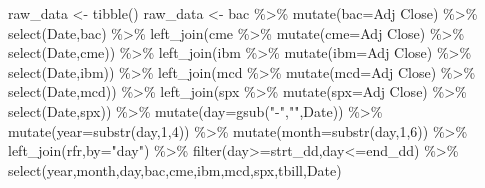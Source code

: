 \documentclass[
  a4paper,
  DIV=11,
  numbers=noendperiod]{scrreprt}
\newenvironment{Shaded}{\begin{snugshade}}{\end{snugshade}}
\newcommand{\AttributeTok}[1]{\textcolor[rgb]{0.40,0.45,0.13}{#1}}
\newcommand{\DecValTok}[1]{\textcolor[rgb]{0.68,0.00,0.00}{#1}}
\newcommand{\FunctionTok}[1]{\textcolor[rgb]{0.28,0.35,0.67}{#1}}
\newcommand{\NormalTok}[1]{\textcolor[rgb]{0.00,0.23,0.31}{#1}}
\newcommand{\OtherTok}[1]{\textcolor[rgb]{0.00,0.23,0.31}{#1}}
\newcommand{\SpecialCharTok}[1]{\textcolor[rgb]{0.37,0.37,0.37}{#1}}
\newcommand{\StringTok}[1]{\textcolor[rgb]{0.13,0.47,0.30}{#1}}
\begin{document}
\begin{Shaded}
\begin{Highlighting}[]
\NormalTok{raw\_data }\OtherTok{\textless{}{-}} \FunctionTok{tibble}\NormalTok{()}
\NormalTok{raw\_data }\OtherTok{\textless{}{-}}\NormalTok{ bac }\SpecialCharTok{\%\textgreater{}\%} \FunctionTok{mutate}\NormalTok{(}\AttributeTok{bac=}\StringTok{\textasciigrave{}}\AttributeTok{Adj Close}\StringTok{\textasciigrave{}}\NormalTok{) }\SpecialCharTok{\%\textgreater{}\%} \FunctionTok{select}\NormalTok{(Date,bac) }\SpecialCharTok{\%\textgreater{}\%} 
  \FunctionTok{left\_join}\NormalTok{(cme }\SpecialCharTok{\%\textgreater{}\%} \FunctionTok{mutate}\NormalTok{(}\AttributeTok{cme=}\StringTok{\textasciigrave{}}\AttributeTok{Adj Close}\StringTok{\textasciigrave{}}\NormalTok{) }\SpecialCharTok{\%\textgreater{}\%} \FunctionTok{select}\NormalTok{(Date,cme)) }\SpecialCharTok{\%\textgreater{}\%} 
  \FunctionTok{left\_join}\NormalTok{(ibm }\SpecialCharTok{\%\textgreater{}\%} \FunctionTok{mutate}\NormalTok{(}\AttributeTok{ibm=}\StringTok{\textasciigrave{}}\AttributeTok{Adj Close}\StringTok{\textasciigrave{}}\NormalTok{) }\SpecialCharTok{\%\textgreater{}\%} \FunctionTok{select}\NormalTok{(Date,ibm)) }\SpecialCharTok{\%\textgreater{}\%} 
  \FunctionTok{left\_join}\NormalTok{(mcd }\SpecialCharTok{\%\textgreater{}\%} \FunctionTok{mutate}\NormalTok{(}\AttributeTok{mcd=}\StringTok{\textasciigrave{}}\AttributeTok{Adj Close}\StringTok{\textasciigrave{}}\NormalTok{) }\SpecialCharTok{\%\textgreater{}\%} \FunctionTok{select}\NormalTok{(Date,mcd)) }\SpecialCharTok{\%\textgreater{}\%} 
  \FunctionTok{left\_join}\NormalTok{(spx }\SpecialCharTok{\%\textgreater{}\%} \FunctionTok{mutate}\NormalTok{(}\AttributeTok{spx=}\StringTok{\textasciigrave{}}\AttributeTok{Adj Close}\StringTok{\textasciigrave{}}\NormalTok{) }\SpecialCharTok{\%\textgreater{}\%} \FunctionTok{select}\NormalTok{(Date,spx)) }\SpecialCharTok{\%\textgreater{}\%} 
  \FunctionTok{mutate}\NormalTok{(}\AttributeTok{day=}\FunctionTok{gsub}\NormalTok{(}\StringTok{"{-}"}\NormalTok{,}\StringTok{""}\NormalTok{,Date)) }\SpecialCharTok{\%\textgreater{}\%} 
  \FunctionTok{mutate}\NormalTok{(}\AttributeTok{year=}\FunctionTok{substr}\NormalTok{(day,}\DecValTok{1}\NormalTok{,}\DecValTok{4}\NormalTok{)) }\SpecialCharTok{\%\textgreater{}\%} 
  \FunctionTok{mutate}\NormalTok{(}\AttributeTok{month=}\FunctionTok{substr}\NormalTok{(day,}\DecValTok{1}\NormalTok{,}\DecValTok{6}\NormalTok{)) }\SpecialCharTok{\%\textgreater{}\%} 
  \FunctionTok{left\_join}\NormalTok{(rfr,}\AttributeTok{by=}\StringTok{"day"}\NormalTok{) }\SpecialCharTok{\%\textgreater{}\%} 
  \FunctionTok{filter}\NormalTok{(day}\SpecialCharTok{\textgreater{}=}\NormalTok{strt\_dd,day}\SpecialCharTok{\textless{}=}\NormalTok{end\_dd) }\SpecialCharTok{\%\textgreater{}\%} 
  \FunctionTok{select}\NormalTok{(year,month,day,bac,cme,ibm,mcd,spx,tbill,Date)}


\end{Highlighting}
\end{Shaded}
\end{document}
